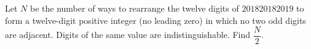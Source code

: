Let $N$ be the number of ways to rearrange the twelve digits of $201820182019$ to form a twelve-digit positive integer (no leading zero) in which no two odd digits are adjacent. Digits of the same value are indistinguishable. Find $\dfrac {N}{2}$.
